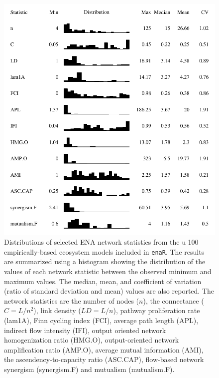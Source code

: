 \documentclass[11pt]{article}
\newcommand{\enaR}{\texttt{enaR}}
\begin{document}
\begin{figure}[t]
\includegraphics[scale=1]{../figures/ns_dist.pdf}
\caption{Distributions of selected ENA network statistics from the
u  100 empirically-based ecosystem models included in \enaR.  The
  results are summarized using a histogram showing the distribution of
  the values of each network statistic between the observed minimum
  and maximum values.  The median, mean, and coefficient of variation
  (ratio of standard deviation and mean) values are also reported.
  The network statistics are the number of nodes ($n$), the
  connectance ($C = L/n^2$), link density ($LD = L/n$), pathway
  proliferation rate (lam1A), Finn cycling index (FCI), average path
  length (APL), indirect flow intensity (IFI), output oriented network
  homogenization ratio (HMG.O), output-oriented network amplification
  ratio (AMP.O), average mutual information (AMI), the
  ascendency-to-capacity ratio (ASC.CAP), flow-based network synergism
  (synergism.F) and mutualism (mutualism.F).} \label{fig:ns}
\end{figure}
\end{document}
